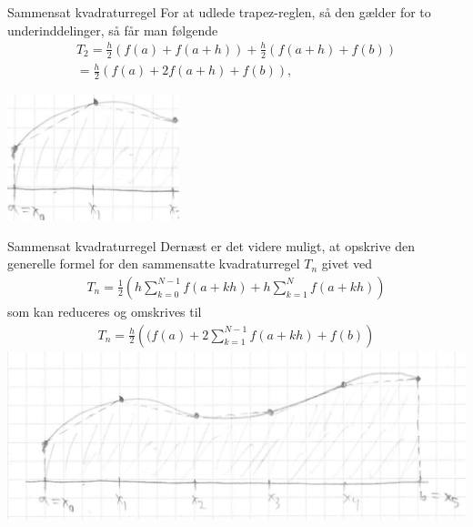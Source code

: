\begin{frame}{Sammensat kvadraturregel}
    For at udlede trapez-reglen, så den gælder for to underinddelinger, så får man følgende 
    \begin{align*}
    T_2=\frac{h}{2}(f(a)+f(a+h))+\frac{h}{2}(f(a+h)+f(b)) \\
    = \frac{h}{2}(f(a)+2f(a+h)+f(b)),
    \end{align*}
\begin{center}
\includegraphics[width=50mm]{images/TRAPEZ12.png}
\end{center}
\end{frame}


\begin{frame}{Sammensat kvadraturregel}
Dernæst er det videre muligt, at opskrive den generelle formel for den sammensatte kvadraturregel $T_n$ givet ved
    \begin{align*}
    T_n = \frac{1}{2}\left (  h\sum_{k=0}^{N-1}f(a+kh)+h\sum_{k=1}^{N}f(a+kh)\right )
    \end{align*}
    som kan reduceres og omskrives til 
    \begin{align*}
    T_n =\frac{h}{2}\left ((f(a)+2\sum_{k=1}^{N-1}f(a+kh)+f(b) \right )
    \end{align*}
\includegraphics[scale=0.3]{images/TRAPEZSAM.png}
\end{frame}

